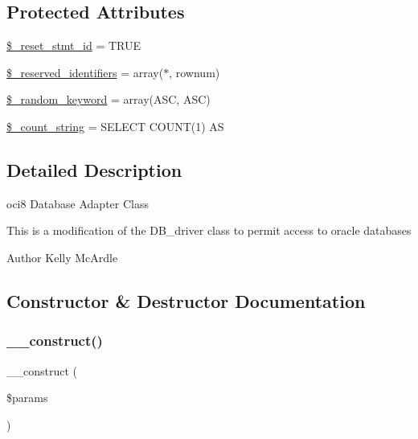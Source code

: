 \subsection*{Protected Attributes}
\begin{DoxyCompactItemize}
\item 
\mbox{\hyperlink{class_c_i___d_b__oci8__driver_ad21690f62001483fa1d13b9ee6143923}{\$\+\_\+reset\+\_\+stmt\+\_\+id}} = T\+R\+UE
\item 
\mbox{\hyperlink{class_c_i___d_b__oci8__driver_aa3298c4c62fbee8bb09f1b75b633fb0d}{\$\+\_\+reserved\+\_\+identifiers}} = array(\textquotesingle{}$\ast$\textquotesingle{}, \textquotesingle{}rownum\textquotesingle{})
\item 
\mbox{\hyperlink{class_c_i___d_b__oci8__driver_a10213aa6e05f6d924d3277bb1d2fea00}{\$\+\_\+random\+\_\+keyword}} = array(\textquotesingle{}A\+SC\textquotesingle{}, \textquotesingle{}A\+SC\textquotesingle{})
\item 
\mbox{\hyperlink{class_c_i___d_b__oci8__driver_a06c80bac2ecbd0557827e96949c23097}{\$\+\_\+count\+\_\+string}} = \textquotesingle{}S\+E\+L\+E\+CT C\+O\+U\+NT(1) AS \textquotesingle{}
\end{DoxyCompactItemize}


\subsection{Detailed Description}
oci8 Database Adapter Class

This is a modification of the D\+B\+\_\+driver class to permit access to oracle databases

\begin{DoxyAuthor}{Author}
Kelly Mc\+Ardle 
\end{DoxyAuthor}


\subsection{Constructor \& Destructor Documentation}
\mbox{\label{class_c_i___d_b__oci8__driver_a9162320adff1a1a4afd7f2372f753a3e}} 
\subsubsection{\texorpdfstring{\+\_\+\+\_\+construct()}{\_\_construct()}}
{\footnotesize\ttfamily \+\_\+\+\_\+construct (\begin{DoxyParamCaption}\item[{}]{\$params }\end{DoxyParamCaption})}

